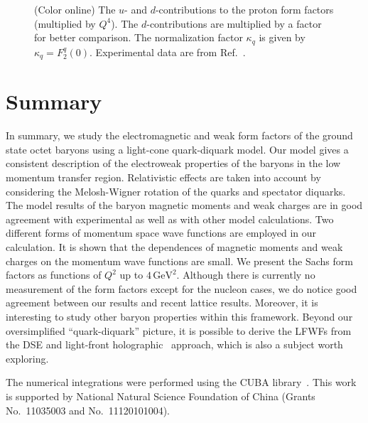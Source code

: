 \documentclass[aps,prc,preprint,groupedaddress,showpacs,superscriptaddress,floatfix]{revtex4-1}
\begin{document}
\begin{figure*}
  \hfill
  \caption{(Color online) The $u$- and $d$-contributions to the proton form factors (multiplied by $Q^4$). The $d$-contributions are multiplied by a factor for better comparison. The normalization factor $\kappa_q$ is given by $\kappa_q=F_2^q(0)$. Experimental data are from Ref.~\cite{cates_flavor_2011}.\label{fig:udneutron}}
\end{figure*}

\section{Summary\label{sec:summary}}
In summary, we study the electromagnetic and weak form factors of the ground state octet baryons using a light-cone quark-diquark model.
Our model gives a consistent description of the electroweak properties of the baryons in the low momentum transfer region.
Relativistic effects are taken into account by considering the Melosh-Wigner rotation of the quarks and spectator diquarks.
The model results of the baryon magnetic moments and weak charges are in good agreement with experimental as well as with other model calculations.
Two different forms of momentum space wave functions are employed in our calculation.
It is shown that the dependences of magnetic moments and weak charges on the momentum wave functions are small.
We present the Sachs form factors as functions of $Q^2$ up to $4\,\mathrm{GeV}^2$.
Although there is currently no measurement of the form factors except for the nucleon cases, we do notice good agreement between our results and recent lattice results.
Moreover, it is interesting to study other baryon properties within this framework.
Beyond our oversimplified ``quark-diquark'' picture, it is possible to derive the LFWFs from the DSE and light-front holographic~\cite{brodsky_ads/cft_2008} approach, which is also a subject worth exploring.

\begin{acknowledgments}
  The numerical integrations were performed using the CUBA library~\cite{hahn_cuba_2005}. This work is supported by National Natural Science Foundation of China (Grants No.~11035003 and No.~11120101004).
\end{acknowledgments}


\end{document}
